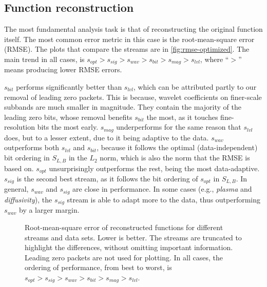 \subsection{Function reconstruction}\label{sec:rmse-optimized}

The most fundamental analysis task is that of reconstructing the original function itself. The most
common error metric in this case is the root-mean-square error (RMSE). The plots that compare the
streams are in \autoref{fig:rmse-optimized}. The main trend in all cases, is $s_{opt} > s_{sig} >
s_{wav} > s_{bit} > s_{mag} > s_{lvl}$, where ``$>$'' means producing lower RMSE errors.

$s_{bit}$ performs significantly better than $s_{lvl}$, which can be attributed partly to our
removal of leading zero packets. This is because, wavelet coefficients on finer-scale subbands are
much smaller in magnitude. They contain the majority of the leading zero bits, whose removal
benefits $s_{bit}$ the most, as it touches fine-resolution bits the most early. $s_{mag}$
underperforms for the same reason that $s_{lvl}$ does, but to a lesser extent, due to it being
adaptive to the data. $s_{wav}$ outperforms both $s_{lvl}$ and $s_{bit}$, because it follows the
optimal (data-independent) bit ordering in $S_{L,B}$ in the $L_2$ norm, which is also the norm that
the RMSE is based on. $s_{opt}$ unsurprisingly outperforms the rest, being the most data-adaptive.
$s_{sig}$ is the second best stream, as it follows the bit ordering of $s_{opt}$ in $S_{L,B}$. In
general, $s_{wav}$ and $s_{sig}$ are close in performance. In some cases (e.g., \emph{plasma} and
\emph{diffusivity}), the $s_{sig}$ stream is able to adapt more to the data, thus outperforming
$s_{wav}$ by a larger margin.

\begin{figure}[t]
  \centering
		\caption{Root-mean-square error of reconstructed functions for different streams and data sets.
		Lower is better. The streams are truncated to highlight the differences, without omitting
		important information. Leading zero packets are not used for plotting. In all cases, the
		ordering of performance, from best to worst, is $s_{opt} > s_{sig} > s_{wav} > s_{bit} > s_{mag}
		> s_{lvl}$.}\label{fig:rmse-optimized}
\end{figure}


